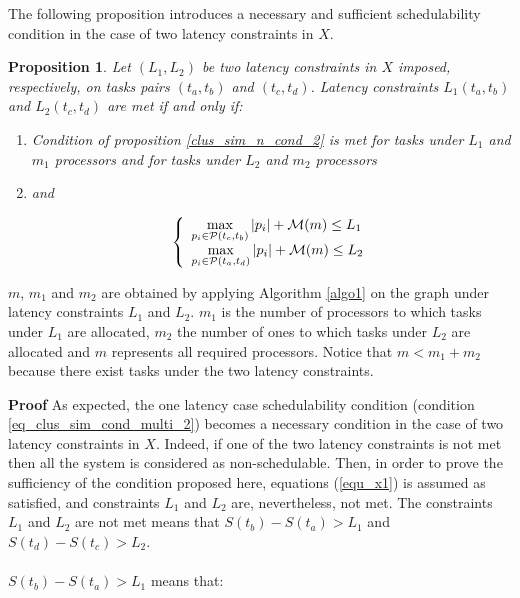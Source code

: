 \documentclass{ijcaArticle}
\newtheorem{Proposition}{Proposition}
\begin{document}
The following proposition introduces a necessary and sufficient schedulability condition in the case of two latency constraints in $X$.
\vskip2mm
\begin{Proposition}\label{th_X}
  Let $(L_1,L_2)$ be two latency constraints in $X$ imposed, respectively, on tasks pairs $(t_{a},t_{b})$ and $(t_{c},t_{d})$. Latency constraints $L_1(t_{a}, t_{b})$  and $L_2(t_{c}, t_{d})$ are met if and only if: 
\begin{enumerate}
\item Condition of proposition \ref{clus_sim_n_cond_2} is met for tasks under $L_1$ and $m_1$ processors and for tasks under $L_2$ and $m_2$ processors
\item  and

\begin{eqnarray}
\left \{\begin{array}{l}
          \max\limits_{p_i \in  {\cal P}(t_c,t_b)} |p_i| +  {\cal M}(m)   \leq L_1      \label{equ_x1} \\
\max\limits_{p_i \in {\cal P}(t_a,t_d)} |p_i|  +   {\cal M}(m)  \leq L_2                    \label{equ_x2} 
\end{array} \right.
\end{eqnarray}
\end{enumerate}
   
  
\end{Proposition} 

$m$, $m_1$ and $m_2$ are obtained by applying Algorithm \ref{algo1} on the graph under latency  constraints $L_1$ and $L_2$. $m_1$ is the number of processors to which tasks under $L_1$ are allocated, $m_2$ the number of ones to which tasks under $L_2$ are allocated and $m$ represents all required processors. Notice that $m < m_1 + m_2$ because there exist tasks under the two latency constraints.    




\vskip2mm

\textbf{Proof} 
As expected, the one latency case schedulability condition (condition \ref{eq_clus_sim_cond_multi_2}) becomes a necessary condition in the case of two latency constraints in $X$. Indeed, if one of the two latency constraints is not met then all the system is considered as non-schedulable.
Then, in order to prove the sufficiency of the condition proposed here, equations (\ref{equ_x1}) is assumed as satisfied, and constraints $L_1$ and $L_2$ are, nevertheless,  not met.  The constraints $L_1$ and $L_2$ are not met means that $S(t_b)-S(t_a) > L_1$ and $S(t_d)-S(t_c) > L_2$. 
\\\\
$S(t_b)-S(t_a) > L_1$ means that: 
\end{document}
